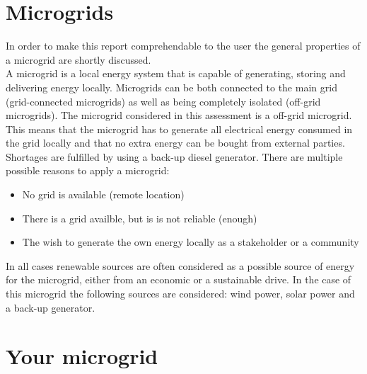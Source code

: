 \documentclass{article}[11pt]
\begin{document}
\begin{large}  \end{large}

\section*{Microgrids}\begin{multicols}{2}\setlength{\parindent}{0pt}

In order to make this report comprehendable to the user the general properties of a microgrid are shortly discussed.\\ A microgrid is a local energy system that is capable of generating, storing and delivering energy locally. Microgrids can be both connected to the main grid (grid-connected microgrids) as well as being completely isolated (off-grid microgrids). The microgrid considered in this assessment is a off-grid microgrid. This means that the microgrid has to generate all electrical energy consumed in the grid locally and that no extra energy can be bought from external parties. Shortages are fulfilled by using a back-up diesel generator. There are multiple possible reasons to apply a microgrid: \begin{itemize}

 \item No grid is available (remote location) 

\item There is a grid availble, but is is not reliable (enough)  

\item The wish to generate the own energy locally as a stakeholder or a community 

\end{itemize}

In all cases renewable sources are often considered as a possible source of energy for the microgrid, either from an economic or a sustainable drive. In the case of this microgrid the following sources are considered: wind power, solar power and a back-up generator.

\end{multicols}\section*{Your microgrid}\begin{multicols}{2}\setlength{\parindent}{0pt}


\end{multicols}
\end{document}
